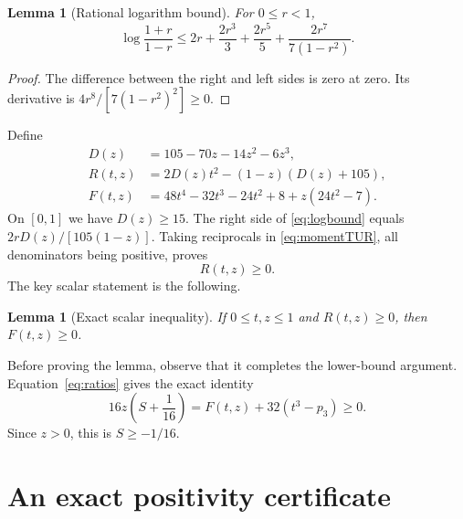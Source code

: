 \documentclass[11pt,a4paper]{article}
\numberwithin{equation}{section}
\newtheorem{lemma}[theorem]{Lemma}
\theoremstyle{remark}
\begin{document}
\begin{lemma}[Rational logarithm bound]\label{lem:log}
For $0\le r<1$,
\begin{equation}\label{eq:logbound}
 \log\frac{1+r}{1-r}
 \le 2r+\frac{2r^3}{3}+\frac{2r^5}{5}
            +\frac{2r^7}{7(1-r^2)}.
\end{equation}
\end{lemma}
\begin{proof}
The difference between the right and left sides is zero at zero. Its
derivative is $4r^8/[7(1-r^2)^2]\ge0$.
\end{proof}

Define
\begin{align}
 D(z)&=105-70z-14z^2-6z^3,\label{eq:D}\\
 R(t,z)&=2D(z)t^2-(1-z)(D(z)+105),\label{eq:R}\\
 F(t,z)&=48t^4-32t^3-24t^2+8+z(24t^2-7).\label{eq:F}
\end{align}
On $[0,1]$ we have $D(z)\ge15$. The right side of
\eqref{eq:logbound} equals $2rD(z)/[105(1-z)]$. Taking reciprocals in
\eqref{eq:momentTUR}, all denominators being positive, proves
\begin{equation}\label{eq:Rnonnegative}
  R(t,z)\ge0.
\end{equation}
The key scalar statement is the following.

\begin{lemma}[Exact scalar inequality]\label{lem:scalar}
If $0\le t,z\le1$ and $R(t,z)\ge0$, then $F(t,z)\ge0$.
\end{lemma}

Before proving the lemma, observe that it completes the lower-bound
argument. Equation~\eqref{eq:ratios} gives the exact identity
\begin{equation}\label{eq:finalLower}
  16z\left(S+\frac1{16}\right)
     =F(t,z)+32(t^3-p_3)\ge0.
\end{equation}
Since $z>0$, this is $S\ge-1/16$.

\section{An exact positivity certificate}\label{sec:certificate}
\end{document}
